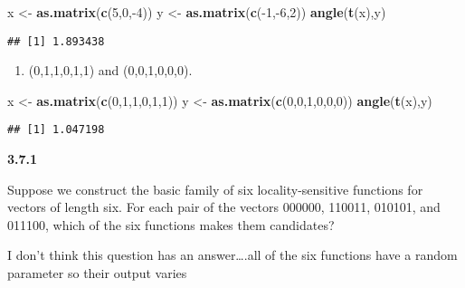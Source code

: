 \documentclass[]{article}
\newenvironment{Shaded}{\begin{snugshade}}{\end{snugshade}}
\newcommand{\KeywordTok}[1]{\textcolor[rgb]{0.13,0.29,0.53}{\textbf{{#1}}}}
\newcommand{\DecValTok}[1]{\textcolor[rgb]{0.00,0.00,0.81}{{#1}}}
\newcommand{\StringTok}[1]{\textcolor[rgb]{0.31,0.60,0.02}{{#1}}}
\newcommand{\NormalTok}[1]{{#1}}
\begin{document}
\begin{Shaded}
\begin{Highlighting}[]
\NormalTok{x <-}\StringTok{ }\KeywordTok{as.matrix}\NormalTok{(}\KeywordTok{c}\NormalTok{(}\DecValTok{5}\NormalTok{,}\DecValTok{0}\NormalTok{,-}\DecValTok{4}\NormalTok{))}
\NormalTok{y <-}\StringTok{ }\KeywordTok{as.matrix}\NormalTok{(}\KeywordTok{c}\NormalTok{(-}\DecValTok{1}\NormalTok{,-}\DecValTok{6}\NormalTok{,}\DecValTok{2}\NormalTok{))}
\KeywordTok{angle}\NormalTok{(}\KeywordTok{t}\NormalTok{(x),y)}
\end{Highlighting}
\end{Shaded}

\begin{verbatim}
## [1] 1.893438
\end{verbatim}

\begin{enumerate}
\def\labelenumi{(\alph{enumi})}
\setcounter{enumi}{3}
\itemsep1pt\parskip0pt
\item
  (0,1,1,0,1,1) and (0,0,1,0,0,0).
\end{enumerate}

\begin{Shaded}
\begin{Highlighting}[]
\NormalTok{x <-}\StringTok{ }\KeywordTok{as.matrix}\NormalTok{(}\KeywordTok{c}\NormalTok{(}\DecValTok{0}\NormalTok{,}\DecValTok{1}\NormalTok{,}\DecValTok{1}\NormalTok{,}\DecValTok{0}\NormalTok{,}\DecValTok{1}\NormalTok{,}\DecValTok{1}\NormalTok{))}
\NormalTok{y <-}\StringTok{ }\KeywordTok{as.matrix}\NormalTok{(}\KeywordTok{c}\NormalTok{(}\DecValTok{0}\NormalTok{,}\DecValTok{0}\NormalTok{,}\DecValTok{1}\NormalTok{,}\DecValTok{0}\NormalTok{,}\DecValTok{0}\NormalTok{,}\DecValTok{0}\NormalTok{))}
\KeywordTok{angle}\NormalTok{(}\KeywordTok{t}\NormalTok{(x),y)}
\end{Highlighting}
\end{Shaded}

\begin{verbatim}
## [1] 1.047198
\end{verbatim}

\textbf{3.7.1}

Suppose we construct the basic family of six locality-sensitive
functions for vectors of length six. For each pair of the vectors
000000, 110011, 010101, and 011100, which of the six functions makes
them candidates?

I don't think this question has an answer\ldots{}.all of the six
functions have a random parameter so their output varies
\end{document}

